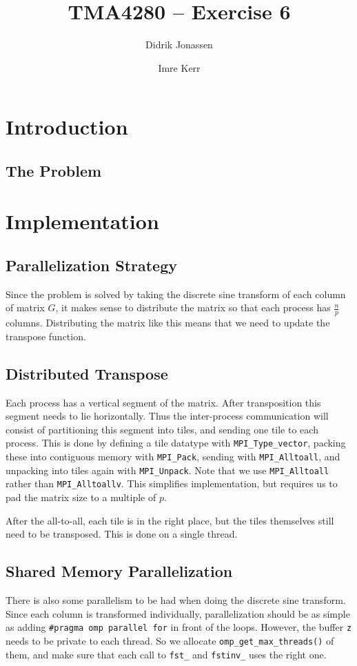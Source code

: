 \documentclass[a4paper, 12pt]{article}
\title{TMA4280 -- Exercise 6}
\author{Didrik Jonassen \and Imre Kerr}
\begin{document}
\maketitle

\section{Introduction}
    \subsection{The Problem}
    
\section{Implementation}
    \subsection{Parallelization Strategy}
    Since the problem is solved by taking the discrete sine transform of each column of matrix $G$, it makes sense to distribute the matrix so that each process has $\frac{n}{p}$ columns. Distributing the matrix like this means that we need to update the transpose function.
    
    \subsection{Distributed Transpose}
    Each process has a vertical segment of the matrix. After transposition this segment needs to lie horizontally. Thus the inter-process communication will consist of partitioning this segment into tiles, and sending one tile to each process. This is done by defining a tile datatype with \texttt{MPI\_Type\_vector}, packing these into contiguous memory with \texttt{MPI\_Pack}, sending with \texttt{MPI\_Alltoall}, and unpacking into tiles again with \texttt{MPI\_Unpack}. Note that we use \texttt{MPI\_Alltoall} rather than \texttt{MPI\_Alltoallv}. This simplifies implementation, but requires us to pad the matrix size to a multiple of $p$.
    
    After the all-to-all, each tile is in the right place, but the tiles themselves still need to be transposed. This is done on a single thread.
    
    \subsection{Shared Memory Parallelization}
    There is also some parallelism to be had when doing the discrete sine transform. Since each column is transformed individually, parallelization should be as simple as adding \texttt{#pragma omp parallel for} in front of the loops. However, the buffer \texttt{z} needs to be private to each thread. So we allocate \texttt{omp\_get\_max\_threads()} of them, and make sure that each call to \texttt{fst\_} and \texttt{fstinv\_} uses the right one.
\end{document}
